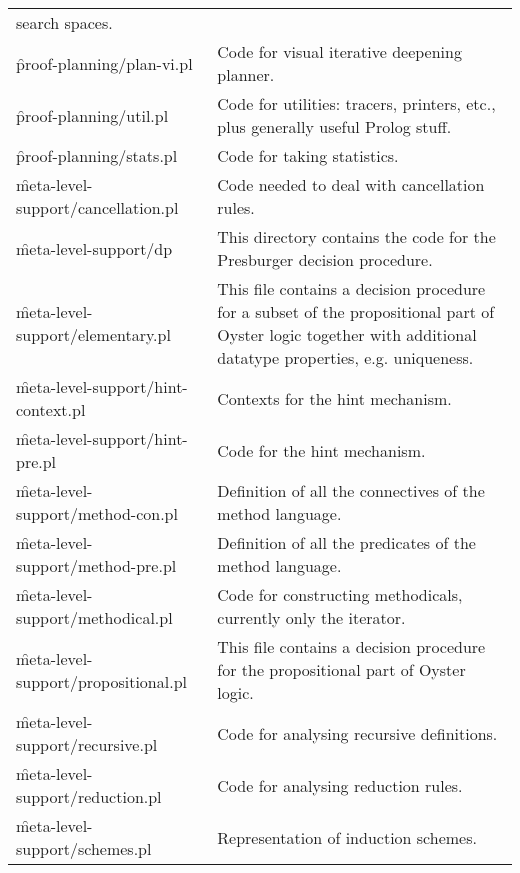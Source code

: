 {\begin{supertabular}{@{}lp{.5\textwidth}@{}}
                        search spaces.\\
\f{proof-planning/plan-vi.pl}   
                        & Code for visual iterative deepening planner.\\
\f{proof-planning/util.pl}              
                        & Code for utilities: tracers, printers, etc., plus
                        generally useful Prolog stuff.\\
\f{proof-planning/stats.pl}             
                        & Code for taking statistics.\\
\f{meta-level-support/cancellation.pl}  
                        & Code needed to deal with cancellation rules. \\
\f{meta-level-support/dp}       
                        & This directory contains the code for the
                          Presburger decision procedure. \\
\f{meta-level-support/elementary.pl}    
                        & This file contains a decision procedure for a subset of the
                          propositional part of Oyster logic together with additional
                          datatype properties, e.g. uniqueness. \\
\f{meta-level-support/hint-context.pl}  
                        & Contexts for the hint mechanism. \\
\f{meta-level-support/hint-pre.pl}      
                        & Code for the hint mechanism. \\
\f{meta-level-support/method-con.pl}    
                        & Definition of all the connectives of the method language.\\
\f{meta-level-support/method-pre.pl}    
                        & Definition of all the predicates of the method language.\\
\f{meta-level-support/methodical.pl}    
                        & Code for constructing methodicals, currently only the iterator.\\
\f{meta-level-support/propositional.pl} 
                        & This file contains a decision procedure for the 
                          propositional part of Oyster logic.\\
\f{meta-level-support/recursive.pl}     
                        & Code for analysing recursive definitions.\\
\f{meta-level-support/reduction.pl}     
                        & Code for analysing reduction rules.\\
\f{meta-level-support/schemes.pl}       
                        & Representation of induction schemes.\\

\end{supertabular}}
